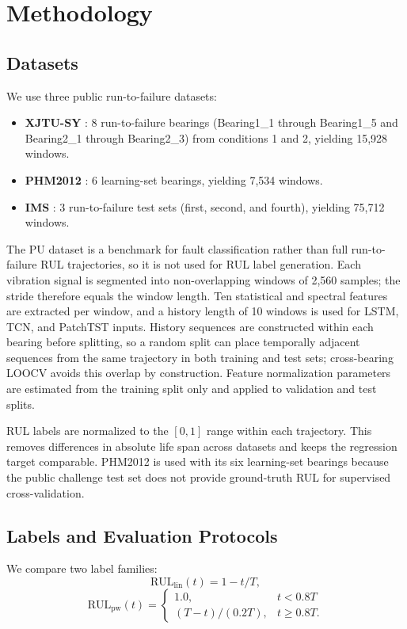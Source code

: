 \documentclass[5p,twocolumn]{elsarticle}
\begin{document}
\section{Methodology}
\subsection{Datasets}
We use three public run-to-failure datasets:
\begin{itemize}
    \item \textbf{XJTU-SY} \cite{xjtusy2019dataset}: 8 run-to-failure bearings (Bearing1\_1 through Bearing1\_5 and Bearing2\_1 through Bearing2\_3) from conditions 1 and 2, yielding 15,928 windows.
    \item \textbf{PHM2012} \cite{nectoux2012pronostia}: 6 learning-set bearings, yielding 7,534 windows.
    \item \textbf{IMS} \cite{ims2006}: 3 run-to-failure test sets (first, second, and fourth), yielding 75,712 windows.
\end{itemize}
The PU dataset is a benchmark for fault classification rather than full run-to-failure RUL trajectories, so it is not used for RUL label generation. Each vibration signal is segmented into non-overlapping windows of 2,560 samples; the stride therefore equals the window length. Ten statistical and spectral features are extracted per window, and a history length of 10 windows is used for LSTM, TCN, and PatchTST inputs. History sequences are constructed within each bearing before splitting, so a random split can place temporally adjacent sequences from the same trajectory in both training and test sets; cross-bearing LOOCV avoids this overlap by construction. Feature normalization parameters are estimated from the training split only and applied to validation and test splits.

RUL labels are normalized to the $[0,1]$ range within each trajectory. This removes differences in absolute life span across datasets and keeps the regression target comparable. PHM2012 is used with its six learning-set bearings because the public challenge test set does not provide ground-truth RUL for supervised cross-validation.

\subsection{Labels and Evaluation Protocols}
We compare two label families:
\begin{equation}
\text{RUL}_{\text{lin}}(t) = 1 - t/T,
\label{eq:linear}
\end{equation}
\begin{equation}
\text{RUL}_{\text{pw}}(t) =
\begin{cases}
1.0, & t < 0.8T \\
(T - t)/(0.2T), & t \geq 0.8T.
\end{cases}
\label{eq:piecewise}
\end{equation}
\end{document}
